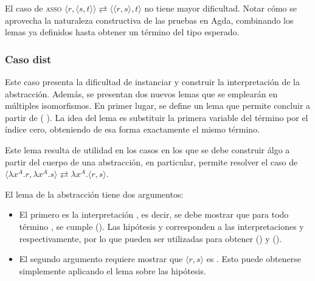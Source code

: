 El caso de \textsc{asso} $\langle r, \langle s,t \rangle \rangle \rightleftarrows \langle \langle r, s \rangle, t \rangle$ no tiene mayor dificultad.
Notar cómo se aprovecha la naturaleza constructiva de las pruebas en Agda, combinando los lemas ya definidos hasta obtener un término del tipo esperado.


\subsubsection{Caso dist}

Este caso presenta la dificultad de instanciar y construir la interpretación de la abstracción.
Además, se presentan dos nuevos lemas que se emplearán en múltiples isomorfismos.
En primer lugar, se define un lema que permite concluir \snstar{} a partir de \snstar ( ).
La idea del lema es substituir la primera variable del término por el índice cero, obteniendo de esa forma exactamente el mismo término.


Este lema resulta de utilidad en los casos en los que se debe construir álgo a partir del cuerpo de una abstracción, en particular, permite resolver el caso de  $\langle \lambda x^A.r, \lambda x^A.s \rangle \rightleftarrows \lambda x^A. \langle r,s \rangle$.


\newcommand{\substu}{\subst{\cons{\bound{u}}{\parens{\comp{\ids}{\bound{$\rho$}}}}}}

El lema de la abstracción tiene dos argumentos:
\begin{itemize}
	\item El primero es la interpretación , es decir, se debe mostrar que para todo término \snstar {}, se cumple \snstar (\pair{\substu\bound{r}}{\substu\bound{s}}).
	Las hipótesis  y  corresponden a las interpretaciones  y  respectivamente, por lo que pueden ser utilizadas para obtener \snstar(\substu{}) y \snstar(\substu{}).
	\item El segundo argumento requiere mostrar que $\langle r, s \rangle$ es \snstar.
	Esto puede obtenerse simplemente aplicando el lema  sobre las hipótesis.
\end{itemize}

